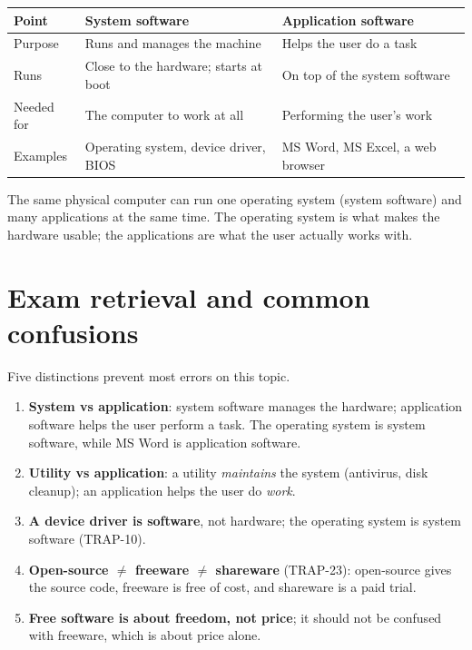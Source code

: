 \begin{center}
\begin{tabular}{p{}p{}p{}}
\toprule
\textbf{Point} & \textbf{System software} & \textbf{Application software} \\
\midrule
Purpose & Runs and manages the machine & Helps the user do a task \\
Runs & Close to the hardware; starts at boot & On top of the system software \\
Needed for & The computer to work at all & Performing the user's work \\
Examples & Operating system, device driver, BIOS & MS Word, MS Excel, a web browser \\
\bottomrule
\end{tabular}
\end{center}

The same physical computer can run one operating system (system software) and
many applications at the same time. The operating system is what makes the
hardware usable; the applications are what the user actually works with.

\section{Exam retrieval and common confusions}
Five distinctions prevent most errors on this topic.
\begin{enumerate}
  \item \textbf{System vs application}: system software manages the hardware;
    application software helps the user perform a task. The operating system
    is system software, while MS Word is application software.
  \item \textbf{Utility vs application}: a utility \emph{maintains} the system
    (antivirus, disk cleanup); an application helps the user do \emph{work}.
  \item \textbf{A device driver is software}, not hardware; the operating
    system is system software (TRAP-10).
  \item \textbf{Open-source $\neq$ freeware $\neq$ shareware} (TRAP-23):
    open-source gives the source code, freeware is free of cost, and shareware
    is a paid trial.
  \item \textbf{Free software is about freedom, not price}; it should not be
    confused with freeware, which is about price alone.
\end{enumerate}

